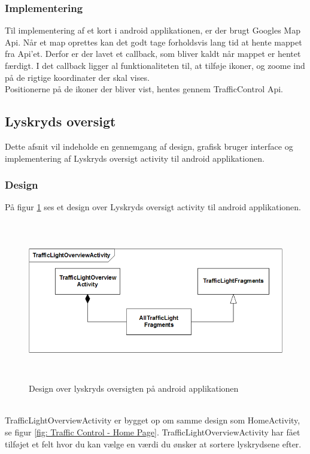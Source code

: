 	\clearpage
		
	\subsubsection{Implementering}
	Til implementering af et kort i android applikationen, er der brugt Googles Map Api\cite{GoogleMapApi}. Når et map oprettes kan det godt tage forholdsvis lang tid at hente mappet fra Api'et. Derfor er der lavet et callback, som bliver kaldt når mappet er hentet færdigt. I det callback ligger al funktionaliteten til, at tilføje ikoner, og zoome ind på de rigtige koordinater der skal vises.
	\\Positionerne på de ikoner der bliver vist, hentes gennem TrafficControl Api.\\
	
\subsection{Lyskryds oversigt}
Dette afsnit vil indeholde en gennemgang af design, grafisk bruger interface og implementering af Lyskryds oversigt activity til android applikationen.
\subsubsection{Design}
På figur \ref{fig:Design over lyskryds oversigten på android applikationen} ses et design over Lyskryds oversigt activity til android applikationen.
\begin{figure} [!ht]
	\begin{center}
		\includegraphics[height=7cm]{Android/Billeder/Lyskryds}
	\end{center}
	\caption{Design over lyskryds oversigten på android applikationen}
	\label{fig:Design over lyskryds oversigten på android applikationen}
\end{figure}\\
TrafficLightOverviewActivity er bygget op om samme design som HomeActivity, se figur \vref{fig: Traffic Control - Home Page}. TrafficLightOverviewActivity har fået tilføjet et felt hvor du kan vælge en værdi du ønsker at sortere lyskrydsene efter.

